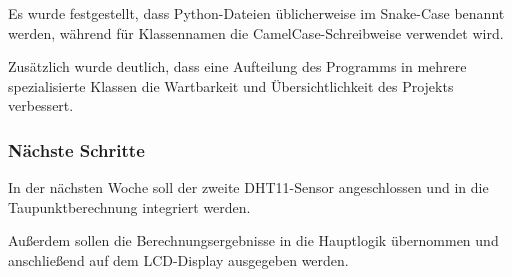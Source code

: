 Es wurde festgestellt, dass Python-Dateien üblicherweise
im Snake-Case benannt werden, während für Klassennamen
die CamelCase-Schreibweise verwendet wird.

Zusätzlich wurde deutlich, dass eine Aufteilung des
Programms in mehrere spezialisierte Klassen die
Wartbarkeit und Übersichtlichkeit des Projekts verbessert.

\subsubsection{Nächste Schritte}

In der nächsten Woche soll der zweite DHT11-Sensor
angeschlossen und in die Taupunktberechnung integriert
werden.

Außerdem sollen die Berechnungsergebnisse in die
Hauptlogik übernommen und anschließend auf dem
LCD-Display ausgegeben werden.